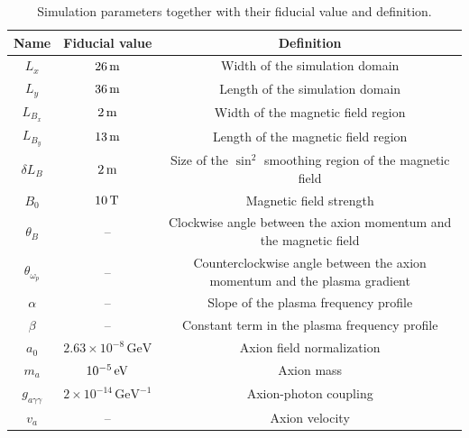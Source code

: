 \documentclass[twocolumn,superscriptaddress,floatfix,preprintnumbers,prd,nofootinbib,aps,10pt]{revtex4-2}
\renewcommand\({\left(}
\renewcommand\){\right)}
\renewcommand\[{\left[}
\renewcommand\]{\right]}
\begin{document}
\begin{table}[t]
    \centering
    \begin{tabular}{c|c|c}
        \hline\hline
        \textbf{Name} & \textbf{Fiducial value} & \textbf{Definition}  \\
        \hline
        $L_x$ & $26 \, \rm m$ & Width of the simulation domain \\
        $L_y$ & $36 \, \rm m$ & Length of the simulation domain \\
        $L_{B_x}$ & $2 \, \rm m$ & Width of the magnetic field region \\
        $L_{B_y}$ & $13 \, \rm m$ & Length of the magnetic field region \\
        $\delta L_B$ & $2 \, \rm m$ & Size of the $\sin^2$ smoothing region of the magnetic field \\
        $B_0$ & $10 \, \rm T$ & Magnetic field strength \\
        $\theta_B$ & -- & Clockwise angle between the axion momentum and the magnetic field \\
        $\theta_{\omega_p}$ & -- & Counterclockwise angle between the axion momentum and the plasma gradient \\
        $\alpha$ & -- & Slope of the plasma frequency profile \\
        $\beta$ & -- & Constant term in the plasma frequency profile \\
        $a_0$ & $2.63 \times 10^{-8} \, \mathrm{GeV}$ & Axion field normalization \\
        $m_a$ & $10^{-5} \, \rm eV$ & Axion mass \\
        $g_{a\gamma\gamma}$ & $2 \times 10^{-14} \, \mathrm{GeV}^{-1}$ & Axion-photon coupling \\
        $v_a$ & -- & Axion velocity \\
        \hline\hline
    \end{tabular}
    \caption{Simulation parameters together with their fiducial value and definition. }
    \label{tab:simparam}
\end{table}
\end{document}
